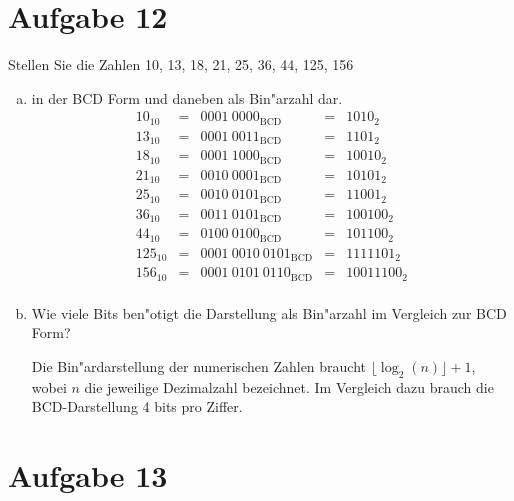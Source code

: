 \documentclass[10pt, oneside]{article}
\begin{document}
\section{Aufgabe 12}
Stellen Sie die Zahlen 10, 13, 18, 21, 25, 36, 44, 125, 156
\begin{enumerate}[(a)]
    \item in der BCD Form und daneben als Bin"arzahl dar.
        \begin{equation*}
            \begin{array}{rcrcl}
                10_{10}  &=&       0001\ 0000_{\text{BCD}} &=& 1010_2 \\[5pt]
                13_{10}  &=&       0001\ 0011_{\text{BCD}} &=& 1101_2 \\[5pt]
                18_{10}  &=&       0001\ 1000_{\text{BCD}} &=& 10010_2 \\[5pt]
                21_{10}  &=&       0010\ 0001_{\text{BCD}} &=& 10101_2 \\[5pt]
                25_{10}  &=&       0010\ 0101_{\text{BCD}} &=& 11001_2 \\[5pt]
                36_{10}  &=&       0011\ 0101_{\text{BCD}} &=& 100100_2 \\[5pt]
                44_{10}  &=&       0100\ 0100_{\text{BCD}} &=& 101100_2 \\[5pt]
                125_{10} &=& 0001\ 0010\ 0101_{\text{BCD}} &=& 1111101_2 \\[5pt]
                156_{10} &=& 0001\ 0101\ 0110_{\text{BCD}} &=& 10011100_2 \\[5pt]
            \end{array}
        \end{equation*}
    \item Wie viele Bits ben"otigt die Darstellung als Bin"arzahl im Vergleich
        zur BCD Form?

        Die Bin"ardarstellung der numerischen Zahlen braucht $\lfloor \log_2(n)
        \rfloor + 1$, wobei $n$ die jeweilige Dezimalzahl bezeichnet. Im Vergleich
        dazu brauch die BCD-Darstellung 4 bits pro Ziffer.
\end{enumerate}

\section{Aufgabe 13}
\end{document}
